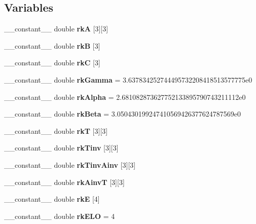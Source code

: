\subsection*{Variables}
\begin{DoxyCompactItemize}
\item 
\+\_\+\+\_\+constant\+\_\+\+\_\+ double {\bfseries rkA} \mbox{[}3\mbox{]}\mbox{[}3\mbox{]}
\item 
\+\_\+\+\_\+constant\+\_\+\+\_\+ double {\bfseries rkB} \mbox{[}3\mbox{]}
\item 
\+\_\+\+\_\+constant\+\_\+\+\_\+ double {\bfseries rkC} \mbox{[}3\mbox{]}
\item 
\+\_\+\+\_\+constant\+\_\+\+\_\+ double {\bfseries rk\+Gamma} = 3.\+637834252744495732208418513577775e0\hypertarget{radau2a_8cu_a1fe408f1f4381de0ba7cc7711ece69b3}{}\label{radau2a_8cu_a1fe408f1f4381de0ba7cc7711ece69b3}

\item 
\+\_\+\+\_\+constant\+\_\+\+\_\+ double {\bfseries rk\+Alpha} = 2.\+681082873627752133895790743211112e0\hypertarget{radau2a_8cu_abcf1cc253cb759bea409e311551ad323}{}\label{radau2a_8cu_abcf1cc253cb759bea409e311551ad323}

\item 
\+\_\+\+\_\+constant\+\_\+\+\_\+ double {\bfseries rk\+Beta} = 3.\+050430199247410569426377624787569e0\hypertarget{radau2a_8cu_a5b10ed992eb38da8c2514a77f18d6b1f}{}\label{radau2a_8cu_a5b10ed992eb38da8c2514a77f18d6b1f}

\item 
\+\_\+\+\_\+constant\+\_\+\+\_\+ double {\bfseries rkT} \mbox{[}3\mbox{]}\mbox{[}3\mbox{]}
\item 
\+\_\+\+\_\+constant\+\_\+\+\_\+ double {\bfseries rk\+Tinv} \mbox{[}3\mbox{]}\mbox{[}3\mbox{]}
\item 
\+\_\+\+\_\+constant\+\_\+\+\_\+ double {\bfseries rk\+Tinv\+Ainv} \mbox{[}3\mbox{]}\mbox{[}3\mbox{]}
\item 
\+\_\+\+\_\+constant\+\_\+\+\_\+ double {\bfseries rk\+AinvT} \mbox{[}3\mbox{]}\mbox{[}3\mbox{]}
\item 
\+\_\+\+\_\+constant\+\_\+\+\_\+ double {\bfseries rkE} \mbox{[}4\mbox{]}
\item 
\+\_\+\+\_\+constant\+\_\+\+\_\+ double {\bfseries rk\+E\+LO} = 4\hypertarget{radau2a_8cu_a4a47a5c2b6246610bacf303f65dc5010}{}\label{radau2a_8cu_a4a47a5c2b6246610bacf303f65dc5010}

\end{DoxyCompactItemize}


